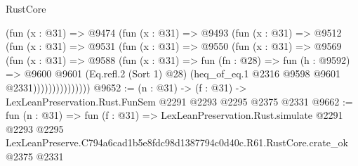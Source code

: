 \begin{lexlean}{RustCore}
\begin{coremodule}
                (fun (x : @31) =>
                @9474
                  (fun (x : @31) =>
                  @9493
                    (fun (x : @31) =>
                    @9512
                      (fun (x : @31) =>
                      @9531
                        (fun (x : @31) =>
                        @9550
                          (fun (x : @31) =>
                          @9569
                            (fun (x : @31) =>
                            @9588
                              (fun (x : @31) =>
                              fun (fn : @28) =>
                              fun (h : @9592) =>
                              @9600
                                @9601
                                (Eq.refl.{2} (Sort 1) @28)
                                (heq_of_eq.{1} @2316 @9598 @9601 @2331)))))))))))))))
@9652 := (n : @31) -> (f : @31) -> LexLeanPreservation.Rust.FunSem @2291 @2293 @2295 @2375 @2331
@9662 := fun (n : @31) =>
  fun (f : @31) =>
  LexLeanPreservation.Rust.simulate
    @2291
    @2293
    @2295
    LexLeanPreserve.C794a6cad1b5e8fdc98d1387794c0d40c.R61.RustCore.crate_ok
    @2375
    @2331
\end{coremodule}
\end{lexlean}
